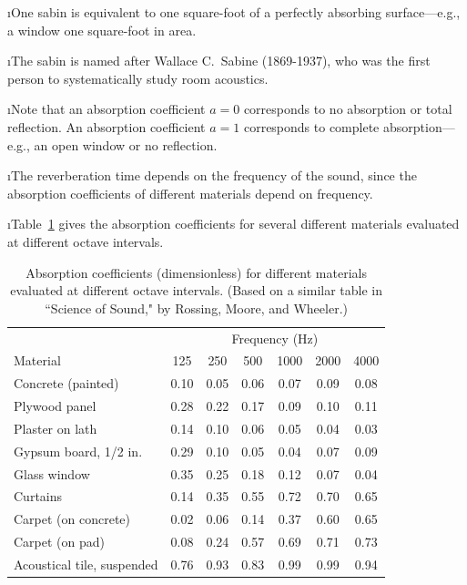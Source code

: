 \i One {\rm sabin} is equivalent to one square-foot of a perfectly 
absorbing surface---e.g., a window one square-foot in area.

\i The sabin is named after Wallace C.\ Sabine (1869-1937), 
who was the
first person to systematically study room acoustics.

\i Note that an absorption coefficient $a=0$
corresponds to no absorption or total reflection.
An absorption coefficient $a=1$ corresponds to 
complete absorption---e.g., an open window or no reflection.

\i The reverberation time depends on the frequency of
the sound, since the absorption coefficients of different
materials depend on frequency.

\i Table~\ref{t:absorption_coefficients} gives the 
absorption coefficients for several different
materials evaluated at different octave intervals.
%
\begin{table}[htbp]
\begin{center}
\begin{tabular}{l c c c c c c}
\hline
& \multicolumn{6}{c}{Frequency (Hz)} \\
Material & 125 & 250 & 500 & 1000 & 2000 & 4000 \\
\hline
Concrete (painted) &
0.10 & 0.05 & 0.06 & 0.07 & 0.09 & 0.08 \\
Plywood panel &
0.28 & 0.22 & 0.17 & 0.09 & 0.10 & 0.11 \\
Plaster on lath &
0.14 & 0.10 & 0.06 & 0.05 & 0.04 & 0.03 \\
Gypsum board, 1/2 in. &
0.29 & 0.10 & 0.05 & 0.04 & 0.07 & 0.09 \\
Glass window &
0.35 & 0.25 & 0.18 & 0.12 & 0.07 & 0.04 \\
Curtains &
0.14 & 0.35 & 0.55 & 0.72 & 0.70 & 0.65 \\
Carpet (on concrete) &
0.02 & 0.06 & 0.14 & 0.37 & 0.60 & 0.65 \\
Carpet (on pad) &
0.08 & 0.24 & 0.57 & 0.69 & 0.71 & 0.73 \\
Acoustical tile, suspended &
0.76 & 0.93 & 0.83 & 0.99 & 0.99 & 0.94 \\
\hline
\end{tabular}
\caption{Absorption coefficients (dimensionless) 
for different materials evaluated at different octave
intervals.
(Based on a similar table in
``Science of Sound," by Rossing, Moore, and Wheeler.)}
\label{t:absorption_coefficients}
\end{center}
\end{table}
%

